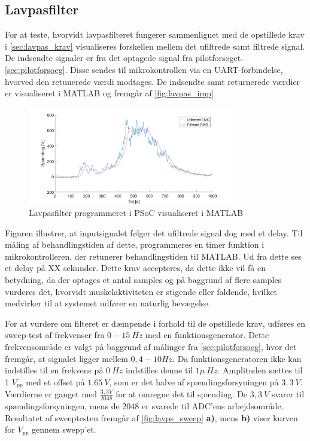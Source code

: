 \subsection{Lavpasfilter}
For at teste, hvorvidt lavpasfilteret fungerer sammenlignet med de opstillede krav i \autoref{sec:lavpas_krav} visualiseres forskellen mellem det ufiltrede samt filtrede signal. 
De indsendte signaler er fra det optagede signal fra pilotforsøget. \autoref{sec:pilotforsoeg}. Disse sendes til mikrokontrollen via en UART-forbindelse, hvorved den retunerede værdi modtages. De indsendte samt returnerede værdier er visualiseret i MATLAB og fremgår af \autoref{fig:lavpas_imp}

\begin{figure}[H]
\centering
\includegraphics[width=0.8\textwidth]{figures/EMG_test}
\caption{Lavpasfilter programmeret i PSoC visualiseret i MATLAB}
\label{fig:lavpas_imp}
\end{figure}

Figuren illustrer, at inputsignalet følger det ufiltrede signal dog med et delay. Til måling af behandlingstiden af dette, programmeres en timer funktion i mikrokontrolleren, der retunerer behandlingstiden til MATLAB. Ud fra dette ses et delay på XX sekunder. Dette krav accepteres, da dette ikke vil få en betydning, da der optages et antal samples og på baggrund af flere samples vurderes det, hvorvidt muskelaktiviteten er stigende eller faldende, hvilket medvirker til at systemet udfører en naturlig bevægelse.


For at vurdere om filteret er dæmpende i forhold til de opstillede krav, udføres en sweep-test af frekvenser fra $0-15~Hz$ med en funktionsgenerator. Dette frekvensområde er valgt på baggrund af målinger fra \autoref{sec:pilotforsoeg}, hvor det fremgår, at signalet ligger mellem $0,4-10Hz$.  Da funktionsgeneratoren ikke kan indstilles til en frekvens på $0~Hz$ indstilles denne til $1 \mu~Hz$. Amplituden sættes til 1 $V_{pp}$ med et offset på $1.65~V$, som er det halve af spændingsforsyningen på $3,3~V$. Værdierne er ganget med $\frac{3,3V}{2048}$ for at omregne det til spænding. De $3,3~V$ svarer til spændingsforsyningen, mens de 2048 er svarede til ADC'ens arbejdsområde. Resultatet af sweeptesten fremgår af \autoref{fig:lavps_sweep} \textbf{a)}, mens \textbf{b)} viser kurven for $V_{pp}$ gennem swepp'et.

